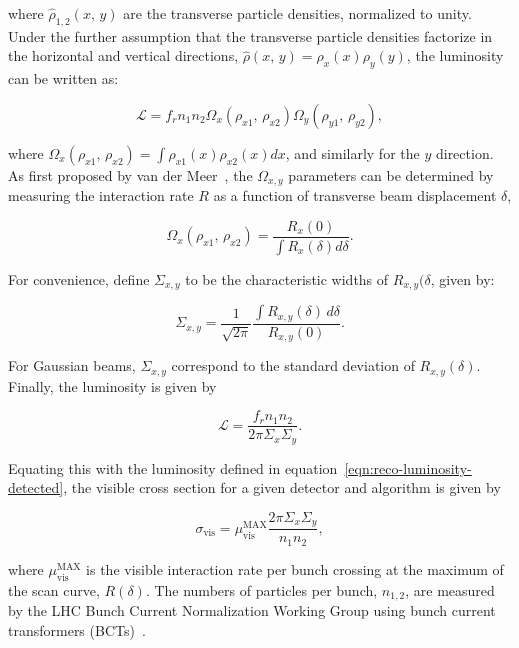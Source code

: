where $\hat{\rho}_{1,2}(x,\,y)$ are the transverse particle densities, normalized to unity. Under the further assumption that the transverse particle densities factorize in the horizontal and vertical directions, $\hat{\rho}(x,\,y)=\rho_x(x)\rho_y(y)$, the luminosity can be written as:

\begin{equation}
	\mathcal{L} = f_r n_1 n_2 \Omega_x(\rho_{x1},\,\rho_{x2}) \Omega_y(\rho_{y1},\,\rho_{y2}),
\end{equation}

where $\Omega_x(\rho_{x1},\,\rho_{x2})=\int \rho_{x1}(x) \rho_{x2}(x) dx$, and similarly for the $y$ direction. As first proposed by van der Meer~\cite{vdm}, the $\Omega_{x,y}$ parameters can be determined by measuring the interaction rate $R$ as a function of transverse beam displacement $\delta$,

\begin{equation}
	\Omega_x (\rho_{x1},\,\rho_{x2}) = \frac{R_x(0)}{\int R_x(\delta) d\delta}.
\end{equation}

For convenience, define $\Sigma_{x,y}$ to be the characteristic widths of $R_{x,y}(\delta$, given by:

\begin{equation}\label{eqn:reco-luminosity-CapSigma}
	\Sigma_{x,y}=\frac{1}{\sqrt{2\pi}} \frac{\int R_{x,y}(\delta)\,d\delta}{R_{x,y}(0)}.
\end{equation}

For Gaussian beams, $\Sigma_{x,y}$ correspond to the standard deviation of $R_{x,y}(\delta)$. Finally, the luminosity is given by

\begin{equation}
	\mathcal{L} = \frac{f_r n_1 n_2}{2\pi \Sigma_x \Sigma_y}.
\end{equation}

Equating this with the luminosity defined in equation~\ref{eqn:reco-luminosity-detected}, the visible cross section for a given detector and algorithm is given by

\begin{equation}
	\sigma_{\mathrm{vis}} = \mu_{\mathrm{vis}}^{\mathrm{MAX}} \frac{2\pi \Sigma_x \Sigma_y}{n_1 n_2},
\end{equation}

where $\mu_{\mathrm{vis}}^{\mathrm{MAX}}$ is the visible interaction rate per bunch crossing at the maximum of the scan curve, $R(\delta)$. The numbers of particles per bunch, $n_{1,2}$, are measured by the LHC Bunch Current Normalization Working Group using bunch current transformers (BCTs)~\cite{BCNWG}. 

